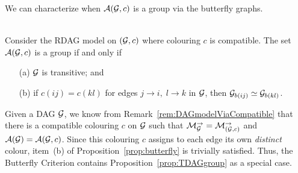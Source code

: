 We can characterize when $\mathcal{A}(\mathcal{G}, c)$ is a group via the butterfly graphs.

\begin{prop}
	\label{prop:butterfly} 
	\ \\
	Consider the RDAG model on $(\mathcal{G}, c)$ where colouring $c$ is compatible. The set $\mathcal{A}(\mathcal{G}, c)$ is a group if and only if
	\begin{itemize}
		\item[(a)] $\mathcal{G}$ is transitive; and
		\item[(b)] if $c(ij) = c(kl)$ for edges $j \to i, \; l \to k$ in $\mathcal{G}$, then $\mathcal{G}_{b(ij)} \simeq \mathcal{G}_{b(kl)}$.
	\end{itemize}
\end{prop}

\begin{remark}
	Given a DAG $\mathcal{G}$, we know from Remark~\ref{rem:DAGmodelViaCompatible} that there is a compatible colouring $c$ on $\mathcal{G}$ such that $\mathcal{M}_{\mathcal{G}}^{\to} = \mathcal{M}_{(\mathcal{G}, c)}^{\to}$ and $\mathcal{A}(\mathcal{G}) = \mathcal{A}(\mathcal{G}, c)$. Since this colouring $c$ assigns to each edge its own \emph{distinct} colour, item~(b) of Proposition~\ref{prop:butterfly} is trivially satisfied.
	Thus, the Butterfly Criterion contains Proposition~\ref{prop:TDAGgroup} as a special case.
	\hfill\remSymbol
\end{remark}

